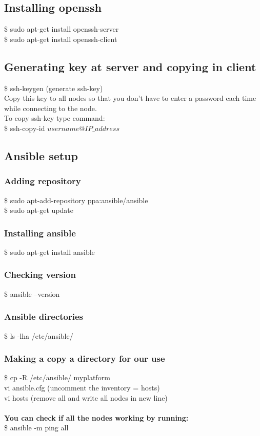 \documentclass[12pt]{article}
\begin{document}
\subsection{Installing openssh}
\$ sudo apt-get install openssh-server\\
\$ sudo apt-get install openssh-client
\subsection{Generating key at server and copying in client}
\$ ssh-keygen (generate ssh-key)\\
Copy this key to all nodes so that you don’t have to enter a password each time while connecting to the node.\\
To copy ssh-key type command:\\
\$ ssh-copy-id $username@IP\_address$
\subsection{Ansible setup}
\subsubsection{Adding repository}
\$ sudo apt-add-repository ppa:ansible/ansible\\
\$ sudo apt-get update
\subsubsection{Installing ansible}
\$ sudo apt-get install ansible
\subsubsection{Checking version}
\$ ansible  --version
\subsubsection{Ansible directories}
\$ ls -lha /etc/ansible/
\subsubsection{Making a copy a directory for our use}
\$ cp -R /etc/ansible/ myplatform\\
vi ansible.cfg (uncomment the inventory =  hosts)\\
vi hosts (remove all and write all nodes in new line)\\\\
\textbf{You can check if all the nodes working by running:}\\
\$ ansible -m ping all
\end{document}
